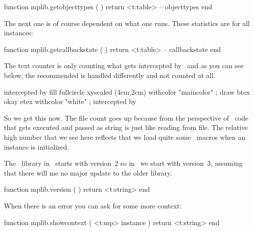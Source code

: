 \startfourrows
\stopfourrows

\starttyping[option=LUA]
function mplib.getobjecttypes ( )
    return <t:table> -- objecttypes
end
\stoptyping

\startfourrows
\stopfourrows

The next one is of course dependent on what one runs. These statistics are for
all instances:

\starttyping[option=LUA]
function mplib.getcallbackstate ( )
    return <t:table> -- callbackstate
end
\stoptyping

\starttworows
\stoptworows

The text counter is only counting what gets intercepted by \METAPOST\ and as you
can see below, the recommended  is handled differently and not
counted at all.

\startlinecorrection
{} {intercepted by \CONTEXT}
  {\startMPcode
      fill fullcircle xyscaled (4cm,2cm) withcolor "maincolor" ;
      draw btex okay etex withcolor "white" ;
   \stopMPcode} {intercepted by \METAPOST}
\stopcombination
\stoplinecorrection

So we get this now. The file count goes up because from the perspective of
\METAPOST\ code that gets executed and passed as string is just like reading from
file. The relative high number that we see here reflects that we load quite some
\METAFUN\ macros when an instance is initialized.

\startthreerows
\stopthreerows

\stopsection

\startsection[title=Information]

The \METAPOST\ library in \LUATEX\ starts with version~2 so in \LUAMETATEX\ we
start with version~3, assuming that there will me no major update to the older
library.

\starttyping[option=LUA]
function mplib.version ( )
    return <t:string>
end
\stoptyping

When there is an error you can ask for some more context:

\starttyping[option=LUA]
function mplib.showcontext ( <t:mp> instance )
    return <t:string>
end
\stoptyping

